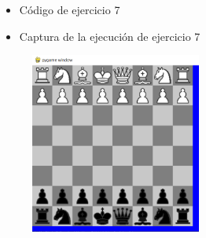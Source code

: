 \documentclass{article}
\begin{document}
	\begin{itemize}
		\item Código de ejercicio 7
	\end{itemize}
	
	\begin{itemize}
		\item Captura de la ejecución de ejercicio 7
	\end{itemize}
	\begin{figure}[H]
		\centering
		\includegraphics[width=0.5\textwidth,keepaspectratio]{imagenes/ejecucion7.png}
	\end{figure}
	
	\clearpage
	
\end{document}
